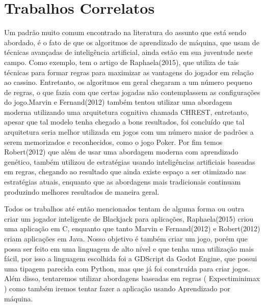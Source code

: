 \section{Trabalhos Correlatos}


    Um padrão muito comum encontrado na literatura do assunto que está sendo abordado, 
    é o fato de que os algoritmos de aprendizado de máquina, que usam de técnicas avançadas 
    de inteligência artificial, ainda estão em sua juventude neste campo. Como exemplo, tem o 
    artigo de Raphaela(2015), que utiliza de tais técnicas para formar regras para maximizar 
    as vantagens do jogador em relação ao cassino. Entretanto, os algoritmos em geral chegaram
    a um número pequeno de regras, o que fazia com que certas jogadas não contemplassem as configurações 
    do jogo.Marvin e Fernand(2012) também tentou utilizar uma abordagem moderna utilizando uma 
    arquitetura cognitiva chamada CHREST, entretanto, apesar que tal modelo tenha chegado a bons 
    resultados, foi concluído que tal arquitetura seria melhor utilizada em jogos com um número 
    maior de padrões a serem memorizados e reconhecidos, como o jogo Poker. Por fim temos Robert(2012)
    que além de usar uma abordagem moderna com aprendizado genético, também utilizou de estratégias usando 
    inteligências artificiais baseadas em regras, chegando ao resultado que ainda existe espaço a 
    ser otimizado nas estratégias atuais, enquanto que as abordagens mais tradicionais
    continuam produzindo melhores resultados de maneira geral.

    Todos os trabalhos até então mencionados tentam de alguma forma ou outra 
    criar um jogador inteligente de Blackjack para aplicações, Raphaela(2015) criou 
    uma aplicação em C, enquanto que tanto Marvin e Fernand(2012) e Robert(2012) criam 
    aplicações em Java. Nosso objetivo é também criar um jogo, porém que possa ser feito 
    em uma linguagem de alto nível e que tenha uma utilização mais fácil, por isso a linguagem 
    escolhida foi a GDScript da Godot Engine, que possui uma tipagem parecida com 
    Python, mas que já foi construída para criar jogos. Além disso, tentaremos utilizar abordagens baseadas 
    em regras ( Expectiminimax ) como também iremos tentar fazer a aplicação usando Aprendizado por máquina.